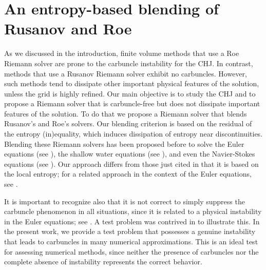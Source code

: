 \documentclass[preprint, 11pt]{article}
\begin{document}
\section{An entropy-based blending of Rusanov and Roe}

As we discussed in the introduction, finite volume methods that use
a Roe Riemann solver are prone to the carbuncle instability for the CHJ.
In contrast, methods that use a Rusanov Riemann solver exhibit no carbuncles. 
However, such methods tend to dissipate other important physical features of
the solution, unless the grid is highly refined.
Our main objective is to study the CHJ and to propose a Riemann solver
that is carbuncle-free but does not dissipate important features of the solution.
To do that we propose a Riemann solver that blends Rusanov's and Roe's solvers.
Our blending criterion is based on the residual of the entropy (in)equality,
which induces dissipation of entropy near discontinuities.
Blending these Riemann solvers has been proposed before
to solve the Euler equations (see
\cite{nishikawa2008very,wang2016developing,jaisankar2007diffusion,ohwada2018simple,deng2019new,ray2013entropy}),
the shallow water equations (see \cite{bader2014carbuncle,kemm2014note}),
and even the Navier-Stokes equations (see \cite{nishikawa2008very,ohwada2018simple}).
Our approach differs from those just cited in that it is based on the local entropy;
for a related approach in the context of the Euler equations, see
\cite{ismail2009affordable,ismail2009proposed}.

It is important to recognize also that it is not correct to simply suppress
the carbuncle phenomenon in all situations, since it is related to a physical
instability in the Euler equations; see \cite{moschetta2001carbuncle,elling2009carbuncle}.
A test problem was contrived in \cite{elling2009carbuncle} to illustrate this.
In the present work, we provide a test problem that possesses a genuine instability
that leads to carbuncles in many numerical approximations.  This is an ideal
test for assessing numerical methods, since neither the presence of carbuncles
nor the complete absence of instability represents the correct behavior.
\end{document}
